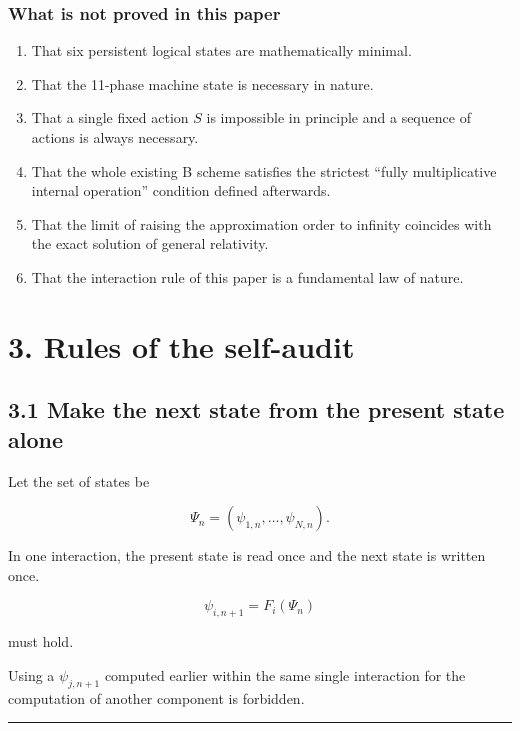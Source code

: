 \documentclass[
  a4paper,
]{article}
\providecommand{\tightlist}{%
  \setlength{\itemsep}{0pt}\setlength{\parskip}{0pt}}
\begin{document}
\subsubsection{What is not proved in this
paper}\label{what-is-not-proved-in-this-paper}

\begin{enumerate}
\def\labelenumi{\arabic{enumi}.}
\tightlist
\item
  That six persistent logical states are mathematically minimal.
\item
  That the 11-phase machine state is necessary in nature.
\item
  That a single fixed action \(S\) is impossible in principle and a
  sequence of actions is always necessary.
\item
  That the whole existing B scheme satisfies the strictest ``fully
  multiplicative internal operation'' condition defined afterwards.
\item
  That the limit of raising the approximation order to infinity
  coincides with the exact solution of general relativity.
\item
  That the interaction rule of this paper is a fundamental law of
  nature.
\end{enumerate}

\section{3. Rules of the self-audit}\label{rules-of-the-self-audit}

\subsection{3.1 Make the next state from the present state
alone}\label{make-the-next-state-from-the-present-state-alone}

Let the set of states be

\[
\Psi_n=(\psi_{1,n},\ldots,\psi_{N,n}).
\]

In one interaction, the present state is read once and the next state is
written once.

\[
\boxed{
\psi_{i,n+1}=F_i(\Psi_n)
}
\]

must hold.

Using a \(\psi_{j,n+1}\) computed earlier within the same single
interaction for the computation of another component is forbidden.

\begin{center}\rule{0.5\linewidth}{0.5pt}\end{center}
\end{document}

